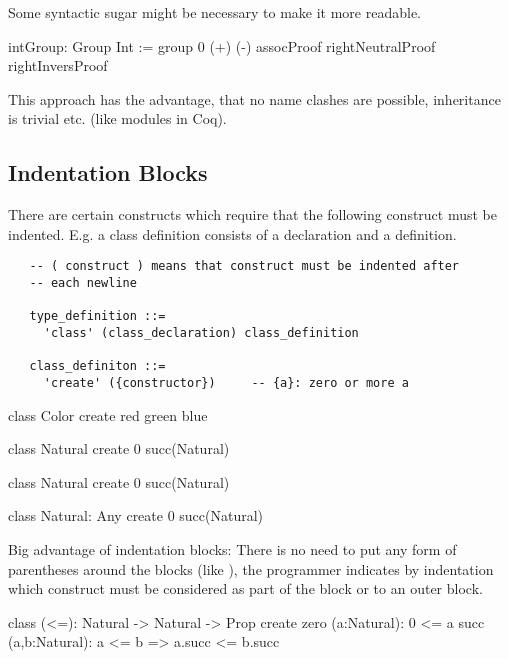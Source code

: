 Some syntactic sugar might be necessary to make it more readable.



\begin{alba}
    intGroup: Group Int :=
        group 0 (+) (-) assocProof rightNeutralProof rightInversProof
\end{alba}

This approach has the advantage, that no name clashes are possible, inheritance
is trivial etc. (like modules in Coq).



\begin{alba}
\end{alba}





\subsection{Indentation Blocks}

There are certain constructs which require that the following construct must
be indented. E.g. a class definition consists of a declaration and a
definition.

{\small
\begin{verbatim}
   -- ( construct ) means that construct must be indented after
   -- each newline

   type_definition ::=
     'class' (class_declaration) class_definition

   class_definiton ::=
     'create' ({constructor})     -- {a}: zero or more a
\end{verbatim}
}


\begin{alba}
  class Color create red green blue

  class Natural create 0 succ(Natural)

  class Natural create
    0
    succ(Natural)

  class
    Natural: Any
  create
    0
    succ(Natural)
\end{alba}


Big advantage of indentation blocks: There is no need to put any form of
parentheses around the blocks (like ), the programmer
indicates by indentation which construct must be considered as part of the
block or to an outer block.


\begin{alba}
  class
    (<=): Natural -> Natural -> Prop
  create
    zero (a:Natural): 0 <= a
    succ (a,b:Natural): a <= b  =>  a.succ <= b.succ
\end{alba}



